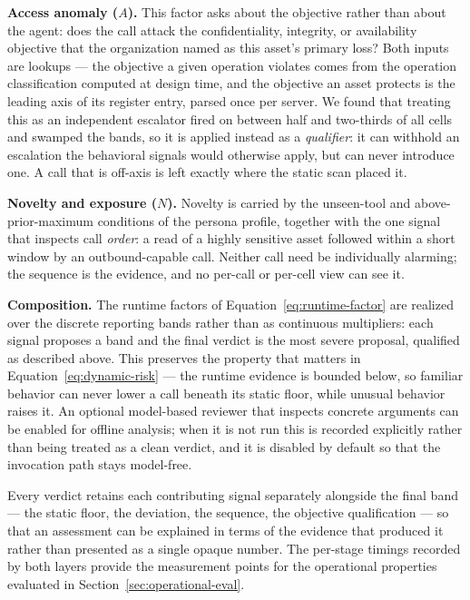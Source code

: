 \documentclass[sigconf]{acmart}
\begin{document}
\textbf{Access anomaly ($A$).} This factor asks about the objective rather than
about the agent: does the call attack the confidentiality, integrity, or
availability objective that the organization named as this asset's primary
loss? Both inputs are lookups --- the objective a given operation violates comes
from the operation classification computed at design time, and the objective an
asset protects is the leading axis of its register entry, parsed once per
server. We found that treating this as an independent escalator fired on
between half and two-thirds of all cells and swamped the bands, so it is
applied instead as a
\emph{qualifier}: it can withhold an escalation the behavioral signals would
otherwise apply, but can never introduce one. A call that is off-axis is left
exactly where the static scan placed it.

\textbf{Novelty and exposure ($N$).} Novelty is carried by the unseen-tool and
above-prior-maximum conditions of the persona profile, together with the one
signal that inspects call \emph{order}: a read of a highly sensitive asset
followed within a short window by an outbound-capable call. Neither call need be
individually alarming; the sequence is the evidence, and no per-call or
per-cell view can see it.

\textbf{Composition.} The runtime factors of Equation~\ref{eq:runtime-factor}
are realized over the discrete reporting bands rather than as continuous
multipliers: each signal proposes a band and the final verdict is the most
severe proposal, qualified as described above. This preserves the property that
matters in Equation~\ref{eq:dynamic-risk} --- the runtime evidence is bounded
below, so familiar behavior can never lower a call beneath its static floor,
while unusual behavior raises it. An optional model-based reviewer that inspects
concrete arguments can be enabled for offline analysis; when it is not run this
is recorded explicitly rather than being treated as a clean verdict, and it is
disabled by default so that the invocation path stays model-free.

Every verdict retains each contributing signal separately alongside the final
band --- the static floor, the deviation, the sequence, the objective
qualification --- so that an assessment can be explained in terms of the
evidence that produced it rather than presented as a single opaque number. The
per-stage timings recorded by both layers provide the measurement points for
the operational properties evaluated in Section~\ref{sec:operational-eval}.
\end{document}

